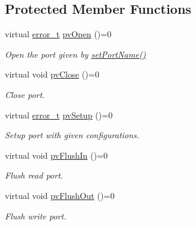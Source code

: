 \subsection*{Protected Member Functions}
\begin{DoxyCompactItemize}
\item 
virtual \hyperlink{classmdt_abstract_port_ad4121bb930c95887e77f8bafa065a85e}{error\-\_\-t} \hyperlink{classmdt_abstract_port_ac1440ea9759cbbee9efc5ea22afcdb0a}{pv\-Open} ()=0
\begin{DoxyCompactList}\small\item\em Open the port given by \hyperlink{classmdt_abstract_port_a0ca143d32fc677bac7c1cf0e04144932}{set\-Port\-Name()} \end{DoxyCompactList}\item 
virtual void \hyperlink{classmdt_abstract_port_add29e91ccc4be62ab5c0dcb2a68ae8f0}{pv\-Close} ()=0
\begin{DoxyCompactList}\small\item\em Close port. \end{DoxyCompactList}\item 
virtual \hyperlink{classmdt_abstract_port_ad4121bb930c95887e77f8bafa065a85e}{error\-\_\-t} \hyperlink{classmdt_abstract_port_a880e5ae1699af102f9a80501bb6a0021}{pv\-Setup} ()=0
\begin{DoxyCompactList}\small\item\em Setup port with given configurations. \end{DoxyCompactList}\item 
virtual void \hyperlink{classmdt_abstract_port_a1fe88e9d56c0881b9566664b094b0958}{pv\-Flush\-In} ()=0
\begin{DoxyCompactList}\small\item\em Flush read port. \end{DoxyCompactList}\item 
virtual void \hyperlink{classmdt_abstract_port_a1667fa938d3a7578b73f54c32015c369}{pv\-Flush\-Out} ()=0
\begin{DoxyCompactList}\small\item\em Flush write port. \end{DoxyCompactList}\end{DoxyCompactItemize}
